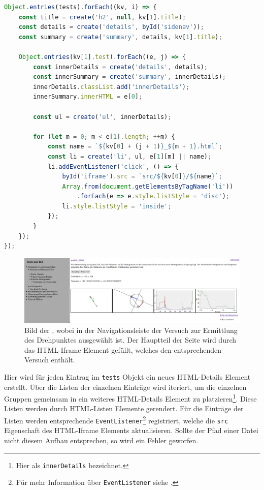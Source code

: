 \begin{lstlisting}[language=JavaScript, caption={Iteration über das tests Objekt zur Befüllung der Navigationsleiste.}, label={lst:tests_objekt_reason}]
Object.entries(tests).forEach((kv, i) => {
    const title = create('h2', null, kv[1].title);
    const details = create('details', byId('sidenav'));
    const summary = create('summary', details, kv[1].title);

    Object.entries(kv[1].test).forEach((e, j) => {
        const innerDetails = create('details', details);
        const innerSummary = create('summary', innerDetails);
        innerDetails.classList.add('innerDetails');
        innerSummary.innerHTML = e[0];

        const ul = create('ul', innerDetails);

        for (let m = 0; m < e[1].length; ++m) {
            const name = `${kv[0] + (j + 1)}_${m + 1}.html`;
            const li = create('li', ul, e[1][m] || name);
            li.addEventListener('click', () => {
                byId('iframe').src = `src/${kv[0]}/${name}`;
                Array.from(document.getElementsByTagName('li'))
                    .forEach(e => e.style.listStyle = 'disc');
                li.style.listStyle = 'inside';
            });
        }
    });
});
\end{lstlisting}

\begin{figure}
    \includegraphics[width=\textwidth]{gfx/index.png}
    \caption[Bild der ]{Bild der , wobei in der Navigationsleiste der Versuch zur Ermittlung des Drehpunktes ausgewählt ist. Der Hauptteil der Seite wird durch das HTML-Iframe Element gefüllt, welches den entsprechenden Versuch enthält.}\label{fig:index.html}
\end{figure}

Hier wird für jeden Eintrag im \lstinline{tests} Objekt ein neues HTML-Details Element erstellt.
Über die Listen der einzelnen Einträge wird iteriert, um die einzelnen Gruppen gemeinsam in ein weiteres HTML-Details Element zu platzieren\footnote{Hier als \lstinline{innerDetails} bezeichnet.}.
Diese Listen werden durch HTML-Listen Elemente gerendert.
Für die Einträge der Listen werden entsprechende \lstinline{EventListener}\footnote{Für mehr Information über \lstinline{EventListener} siehe .} registriert, welche die \lstinline{src} Eigenschaft des HTML-Iframe Elements aktualisieren.
Sollte der Pfad einer Datei nicht diesem Aufbau entsprechen, so wird ein Fehler geworfen.

